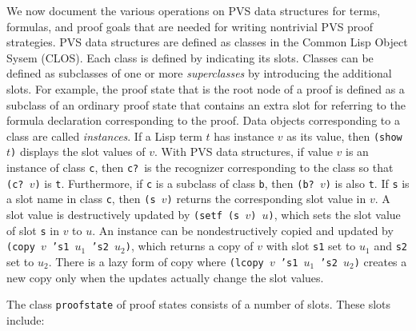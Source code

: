 \documentclass[12pt,twoside]{book}
\begin{document}
We now document the various operations on PVS data structures for terms,
formulas, 
and proof goals that are needed for writing nontrivial PVS proof
strategies.  PVS data structures are defined as classes in the Common Lisp
Object Sysem (CLOS).  Each class is defined by indicating its slots.
Classes can be defined as subclasses of one or more \emph{superclasses}
by introducing the additional slots.  For example, the proof state
that is the root node of a proof is defined as a subclass of an ordinary
proof state that contains an extra slot for referring to the formula
declaration corresponding to the 
proof.  Data objects corresponding to a class are called \emph{instances}\@.  If a Lisp term $t$ has instance $v$ as its value, then
\texttt{(show \(t\))} displays the slot values of $v$\@.  With PVS
data structures, if value $v$ is an instance of class \texttt{c}, then
\texttt{c?}\ is the recognizer corresponding to the class so that
\texttt{(c?~\(v\))} is \texttt{t}.  Furthermore, if \texttt{c} is a subclass of
class \texttt{b}, then \texttt{(b?~\(v\))} is also \texttt{t}\@.  If \texttt{s} is a
slot name in class \texttt{c}, then \texttt{(s \(v\))} returns the corresponding
slot value in $v$\@.    A slot value is destructively updated by
\texttt{(setf (s \(v\)) \(u\))}, which sets the slot value of slot \texttt{s}
in $v$ to $u$\@.  An instance can be nondestructively copied and updated
by \texttt{(copy \(v\) 's1 \(u_1\) 's2 \(u_2\))}, which returns a copy of
$v$ with slot \texttt{s1} set to $u_1$ and \texttt{s2} set to $u_2$\@.
There is a lazy form of copy where \texttt{(lcopy \(v\) 's1 \(u_1\) 's2
\(u_2\))}  creates a new copy only when the updates actually change
the slot values.

The class \texttt{proofstate} of proof states consists of a number of slots.
These slots include:
\end{document}
